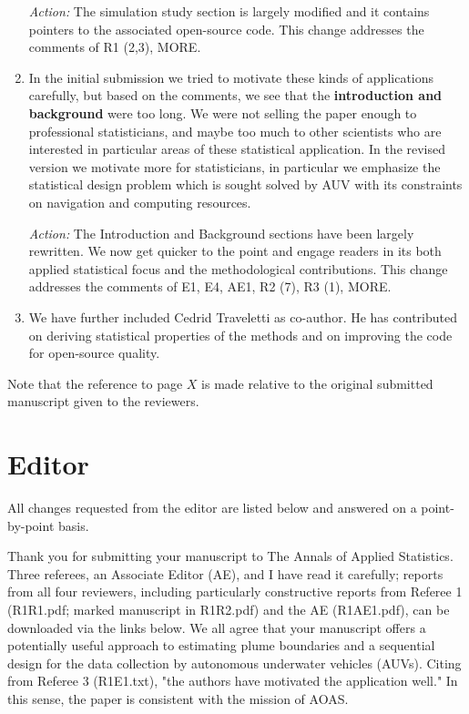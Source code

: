 \documentclass[a4paper]{article}
\newcounter{reviewer}
\begin{document}
\begin{enumerate}
{\it{Action:}} The simulation study section is largely modified and it contains pointers to the associated open-source code. This change addresses the comments of R1 (2,3),  MORE.


\item In the initial submission we tried to motivate these kinds of applications carefully, but based on the comments, we see that the {\bf{introduction and background}} were too long. We were not selling the paper enough to professional statisticians, and maybe too much to other scientists who are interested in particular areas of these statistical application. In the revised version we motivate more for statisticians, in particular we emphasize the statistical design problem which is sought solved by AUV with its constraints on navigation and computing resources.

{\it{Action:}} The Introduction and Background sections have been largely rewritten. We now get quicker to the point and engage readers in its both applied statistical focus and the methodological contributions. This change addresses the comments of E1, E4, AE1, R2 (7), R3 (1), MORE.

\item We have further included Cedrid Traveletti as co-author. He has contributed on deriving statistical properties of the methods and on improving the code for open-source quality. 

\end{enumerate}
\par \vspace{1em}

Note that the reference to page $X$ is made relative to
the original submitted manuscript given to the reviewers.


\section*{Editor}
All changes requested from the editor are listed below and answered on a point-by-point basis.

	
\vspace{5mm}

Thank you for submitting your manuscript to The Annals of 
Applied Statistics.  Three referees, an Associate Editor (AE),
and I have read it carefully; reports from all four reviewers,
including particularly constructive reports from Referee 1
(R1R1.pdf; marked manuscript in R1R2.pdf) and the AE (R1AE1.pdf), 
can be downloaded via the links below. We all agree that your 
manuscript offers a potentially useful approach to estimating 
plume boundaries and a sequential design for the data collection
by autonomous underwater vehicles (AUVs). Citing from Referee 3
(R1E1.txt), "the authors have motivated the application well."
In this sense, the paper is consistent with the mission of AOAS.
\end{document}
